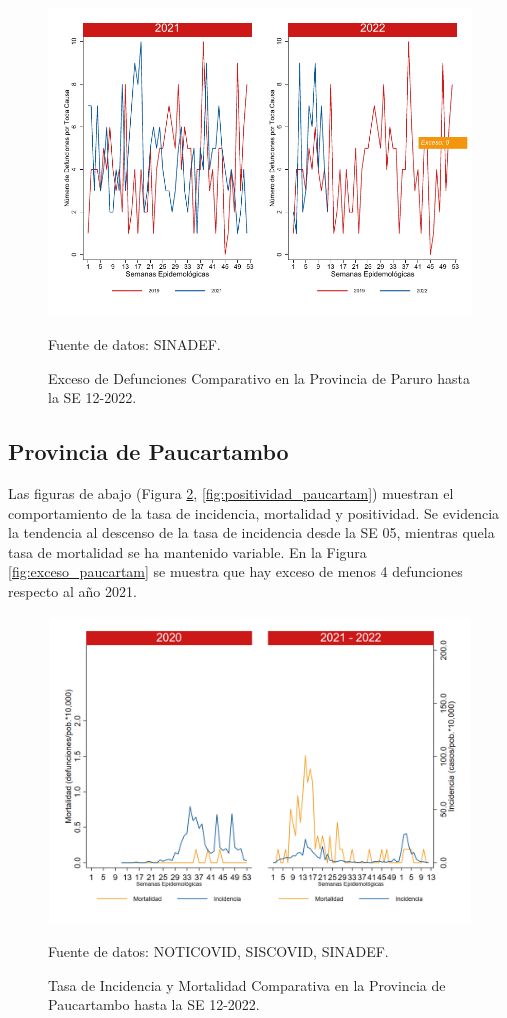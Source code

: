 \documentclass[12pt,a4paper,openany]{book}
\begin{document}
		\begin{figure}[h]
			\caption{Exceso de Defunciones Comparativo en la Provincia de Paruro hasta la SE 12-2022.}\label{fig:exceso_paruro}
			\begin{center}
				\includegraphics[width=0.7\linewidth]{../figuras/exceso_10.pdf}
			\end{center}
			{\footnotesize {Fuente de datos: SINADEF.}}
		\end{figure}
		
		
		\clearpage
		
		\subsection*{Provincia de Paucartambo}
		\noindent Las figuras de abajo (Figura \ref{fig:inc_mort_paucartam}, \ref{fig:positividad_paucartam}) muestran el comportamiento de la tasa de incidencia, mortalidad y positividad. Se evidencia la tendencia al descenso de la tasa de incidencia desde la SE 05, mientras quela tasa de mortalidad se ha mantenido variable.  
	En la Figura \ref{fig:exceso_paucartam} se muestra que hay exceso de menos 4 defunciones respecto al año 2021.  
		
		\begin{figure}[h]
			\caption{Tasa de Incidencia y Mortalidad Comparativa en la Provincia de Paucartambo hasta la SE 12-2022.}\label{fig:inc_mort_paucartam}
			\begin{center}
				\includegraphics[width=0.85\linewidth]{../figuras/incidencia_mortalidad_20_21_11.png}
			\end{center}
			{\footnotesize {Fuente de datos: NOTICOVID, SISCOVID, SINADEF.}}
		\end{figure}
		
\end{document}
